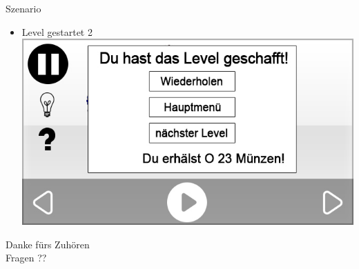 \documentclass[18pt]{beamer}
\begin{document}
\begin{frame}{Szenario}
\begin{itemize}
\item Level gestartet 2
\includegraphics[scale=0.5]{../gui/_jpeg/game_completed}
\end{itemize}
\end{frame}

\begin{frame}
\begin{center}

\color{blue} \Huge Danke fürs Zuhören 
\\[1cm]
\color{blue} \Huge Fragen ??
\end{center}
\end{frame}
\end{document}
